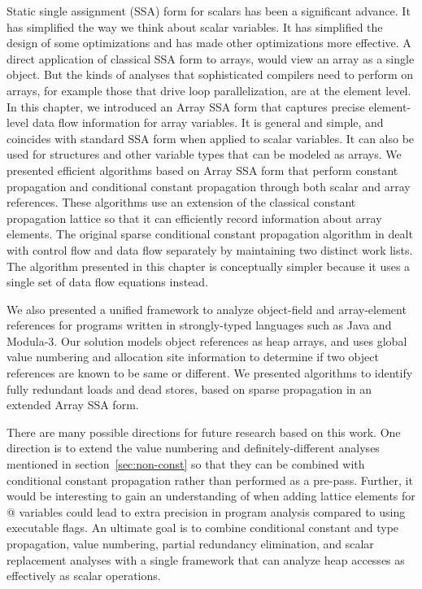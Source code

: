 
Static single assignment (SSA) form for scalars has been a significant
advance. It has simplified the way we think about scalar variables.
It has simplified the design of some optimizations and has made other
optimizations more effective. A direct application of classical SSA form to
arrays, would 
view an array as a single object.  But the kinds of analyses that
sophisticated compilers need to perform on
arrays, for example those that drive loop parallelization, are at the
element level.  
In this chapter, we introduced an Array SSA form that captures precise
element-level data flow information for array variables. It is general and simple, and coincides with standard SSA form
when applied to scalar variables.  It can also be used for structures
and other variable types that can be modeled as arrays.  
We presented efficient algorithms based on Array SSA form that perform
constant propagation and
conditional constant propagation through both
scalar and array references.
These algorithms use an extension of the classical constant
propagation lattice so that it can efficiently record information
about array elements.  
The original sparse conditional constant propagation algorithm in
\cite{WeZa91} dealt with control flow and data flow separately by
maintaining two distinct work lists.  The algorithm presented in this chapter
is conceptually simpler because it uses a single set
of data flow equations instead. 

We also presented a unified framework to analyze
object-field and array-element references for programs written in
strongly-typed languages such as Java and Modula-3.  Our solution
models object references as heap
arrays, and uses global value numbering and allocation site
information to determine if two object references are known to be same
or different.  We presented algorithms to identify fully redundant
loads and dead stores, based on sparse propagation in an extended Array SSA
form.

There are many possible directions for future research based on this work.
One direction is to extend the value numbering and 
definitely-different analyses mentioned in section~\ref{sec:non-const}
so that they can be combined with conditional constant propagation
rather than performed as a pre-pass.
Further, it would be interesting 
to gain an understanding of when
adding lattice elements for @ variables could lead to 
extra precision in program analysis 
compared to using executable flags.
An ultimate goal is
to combine conditional constant and type propagation, value numbering, partial redundancy elimination,
and scalar replacement analyses with a single framework that can
analyze heap accesses as effectively as scalar operations.
